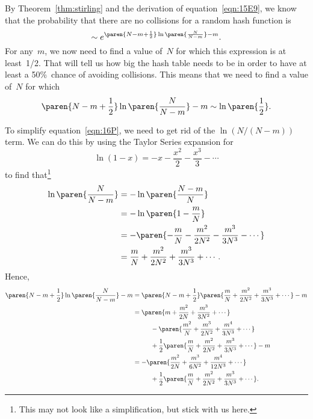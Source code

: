 \begin{editingnotes}
By Theorem~\ref{thm:stirling} and the derivation of
equation~\eqref{eqn:15E9}, we know that the probability that there are
no collisions for a random hash function is
\begin{equation}\label{eqn:16K}
    \sim e^{ \paren{N - m + \frac{1}{2}} \ln\paren{\frac{N}{N - m}} - m }.
\end{equation}
For any~$m$, we now need to find a value of~$N$ for which this
expression is at least~1/2.  That will tell us how big the hash table
needs to be in order to have at least a 50\%~chance of avoiding
collisions.  This means that we need to find a value of~$N$ for which
\begin{equation}\label{eqn:16P}
    \paren{N - m + \frac{1}{2}} \ln\paren{\frac{N}{N - m}} - m 
        \sim
    \ln\paren{\frac{1}{2}}.
\end{equation}

To simplify equation~\eqref{eqn:16P}, we need to get rid of the
$\ln(N/(N - m))$ term.  We can do this by using the Taylor Series
expansion for
\begin{equation*}
    \ln(1 - x) = -x - \frac{x^2}{2} - \frac{x^3}{3} - \cdots
\end{equation*}
to find that\footnote{This may not look like a simplification, but
  stick with us here.}
\begin{align*}
\ln\paren{\frac{N}{N - m}}
    &= - \ln \paren{\frac{N - m}{N}} \\
    &= - \ln \paren{1 - \frac{m}{N}} \\
    &= - \paren{ -\frac{m}{N} - \frac{m^2}{2N^2} - \frac{m^3}{3N^3} - \cdots }\\
    &= \frac{m}{N} + \frac{m^2}{2N^2} + \frac{m^3}{3N^3} + \cdots.
\end{align*}
Hence,
\begin{align}
\paren{N - m + \frac{1}{2}} \ln\paren{\frac{N}{N - m}} - m
    &= \paren{N - m + \frac{1}{2}}
        \paren{\frac{m}{N} + \frac{m^2}{2N^2} + \frac{m^3}{3N^3} + \cdots}
        - m \notag\\
    &= \paren{ m + \frac{m^2}{2N} + \frac{m^3}{3N^2} + \cdots }
            \notag\\
    &\phantom{=}\qquad - \paren{ \frac{m^2}{N} + \frac{m^3}{2N^2} +
          \frac{m^4}{3N^3} + \cdots }
            \notag\\
    &\phantom{=}\qquad + \frac{1}{2} \paren{\frac{m}{N} +
          \frac{m^2}{2N^2} + \frac{m^3}{3N^3} + \cdots} -m 
            \notag\\
    &= - \paren{ \frac{m^2}{2N} + \frac{m^3}{6N^2} + \frac{m^4}{12N^3}
            + \cdots} \notag\\
    &\phantom{=}\qquad
        + \frac{1}{2}\paren{ \frac{m}{N} + \frac{m^2}{2N^2} +
          \frac{m^3}{3N^3} + \cdots }.
    \label{eqn:16Q}
\end{align}


\end{editingnotes}
